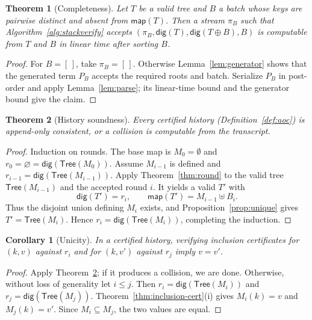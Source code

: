 \documentclass[11pt]{article}
\newtheorem{theorem}{Theorem}
\newtheorem{corollary}{Corollary}
\begin{document}
\begin{theorem}[Completeness]
\label{thm:complete}
Let $T$ be a valid tree and $B$ a batch whose keys are pairwise distinct and absent from $\mathsf{map}(T)$. Then a stream $\pi_B$ such that Algorithm~\ref{alg:stackverify} accepts $(\pi_B, \mathsf{dig}(T), \mathsf{dig}(T \oplus B), B)$ is computable from $T$ and $B$ in linear time after sorting $B$.
\end{theorem}
\begin{proof}
For $B=[\,]$, take $\pi_B=[\,]$. Otherwise Lemma~\ref{lem:generator} shows that the generated term $P_B$ accepts the required roots and batch. Serialize $P_B$ in post-order and apply Lemma~\ref{lem:parse}; its linear-time bound and the generator bound give the claim.
\end{proof}

\begin{theorem}[History soundness]
\label{thm:history}
Every certified history (Definition~\ref{def:aoc}) is append-only consistent, or a collision is computable from the transcript.
\end{theorem}
\begin{proof}
Induction on rounds. The base map is $M_0=\emptyset$ and $r_0=\varnothing=\mathsf{dig}(\mathsf{Tree}(M_0))$. Assume $M_{i-1}$ is defined and $r_{i-1}=\mathsf{dig}(\mathsf{Tree}(M_{i-1}))$. Apply Theorem~\ref{thm:round} to the valid tree $\mathsf{Tree}(M_{i-1})$ and the accepted round $i$. It yields a valid $T'$ with
\[
  \mathsf{dig}(T')=r_i,
  \qquad
  \mathsf{map}(T')=M_{i-1}\uplus B_i.
\]
Thus the disjoint union defining $M_i$ exists, and Proposition~\ref{prop:unique} gives $T'=\mathsf{Tree}(M_i)$. Hence $r_i=\mathsf{dig}(\mathsf{Tree}(M_i))$, completing the induction.
\end{proof}

\begin{corollary}[Unicity]
\label{cor:unicity}
In a certified history, verifying inclusion certificates for $(k, v)$ against $r_i$ and for $(k, v')$ against $r_j$ imply $v = v'$.
\end{corollary}
\begin{proof}
Apply Theorem~\ref{thm:history}; if it produces a collision, we are done. Otherwise, without loss of generality let $i\leq j$. Then $r_i=\mathsf{dig}(\mathsf{Tree}(M_i))$ and $r_j=\mathsf{dig}(\mathsf{Tree}(M_j))$. Theorem~\ref{thm:inclusion-cert}(i) gives $M_i(k)=v$ and $M_j(k)=v'$. Since $M_i\subseteq M_j$, the two values are equal.
\end{proof}
\end{document}
